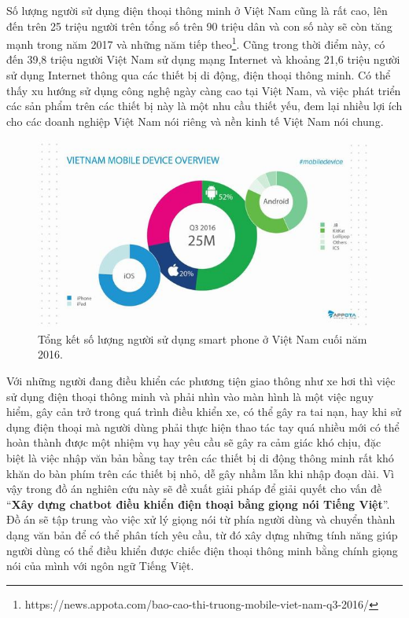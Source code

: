 \documentclass[12pt]{report}
\begin{document}
Số lượng người sử dụng điện thoại thông minh ở Việt Nam cũng là rất cao, lên đến trên 25 triệu người trên tổng số trên 90 triệu dân và con số này sẽ còn tăng mạnh trong năm 2017 và những năm tiếp theo{\footnote{https://news.appota.com/bao-cao-thi-truong-mobile-viet-nam-q3-2016/}}. Cũng trong thời điểm này, có đến 39,8 triệu người Việt Nam sử dụng mạng Internet và khoảng 21,6 triệu người sử dụng Internet thông qua các thiết bị di động, điện thoại thông minh. Có thể thấy xu hướng sử dụng công nghệ ngày càng cao tại Việt Nam, và việc phát triển các sản phẩm trên các thiết bị này là một nhu cầu thiết yếu, đem lại nhiều lợi ích cho các doanh nghiệp Việt Nam nói riêng và nền kinh tế Việt Nam nói chung.

\begin{figure}[H]
  \centering
    \includegraphics[width=15cm]{Pics/Chap1/mobile-vietnam.jpg}
  \caption{Tổng kết số lượng người sử dụng smart phone ở Việt Nam cuối năm 2016.}
\end{figure}

Với những người đang điều khiển các phương tiện giao thông như xe hơi thì việc sử dụng điện thoại thông minh và phải nhìn vào màn hình là một việc nguy hiểm, gây cản trở trong quá trình điều khiển xe, có thể gây ra tai nạn, hay khi sử dụng điện thoại mà người dùng phải thực hiện thao tác tay quá nhiều mới có thể hoàn thành được một nhiệm vụ hay yêu cầu sẽ gây ra cảm giác khó chịu, đặc biệt là việc nhập văn bản bằng tay trên các thiết bị di động thông minh rất khó khăn do bàn phím trên các thiết bị nhỏ, dễ gây nhầm lẫn khi nhập đoạn dài. Vì vậy trong đồ án nghiên cứu này sẽ đề xuất giải pháp để giải quyết cho vấn đề ``\textbf{Xây dựng chatbot điều khiển điện thoại bằng giọng nói Tiếng Việt}''. Đồ án sẽ tập trung vào việc xử lý giọng nói từ phía người dùng và chuyển thành dạng văn bản để có thể phân tích yêu cầu, từ đó xây dựng những tính năng giúp người dùng có thể điều khiển được chiếc điện thoại thông minh bằng chính giọng nói của mình với ngôn ngữ Tiếng Việt.
\end{document}
